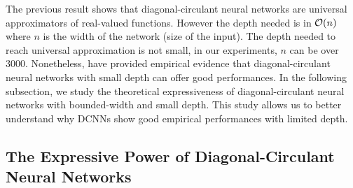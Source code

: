 The previous result shows that diagonal-circulant neural networks are universal approximators of real-valued functions.
However the depth needed is in $\mathcal{O}(n)$ where $n$ is the width of the network (size of the input).
The depth needed to reach universal approximation is not small, in our experiments, $n$ can be over 3000.
Nonetheless, \citet{cheng2015exploration} have provided empirical evidence that diagonal-circulant neural networks with small depth can offer good performances.
In the following subsection, we study the theoretical expressiveness of diagonal-circulant neural networks with bounded-width and small depth.
This study allows us to better understand why DCNNs show good empirical performances with limited depth.






\subsection{The Expressive Power of Diagonal-Circulant Neural Networks}
\label{subsection:ch4-on_the_expressive_power_of_diagonal-circulant_neural_networks}




